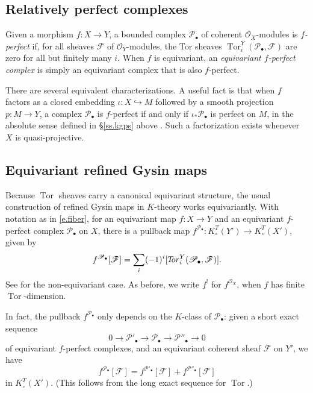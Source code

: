 \documentclass[11pt]{amsart}
\theoremstyle{definition}
\begin{document}
\subsection{Relatively perfect complexes}

Given a morphism $f\colon X \to Y$, a bounded complex ${\mathscr{P}}_\bullet$ of coherent ${\mathcal{O}}_X$-modules is \emph{$f$-perfect} if, for all sheaves ${\mathscr{F}}$ of ${\mathcal{O}}_Y$-modules, the Tor sheaves $\operatorname{Tor}^Y_i({\mathscr{P}}_\bullet,{\mathscr{F}})$ are zero for all but finitely many $i$.  When $f$ is equivariant, an \emph{equivariant $f$-perfect complex} is simply an equivariant complex that is also $f$-perfect.

There are several equivalent characterizations.  A useful fact is that when $f$ factors as a closed embedding $\iota\colon X \hookrightarrow M$ followed by a smooth projection $p\colon M \to Y$, a complex ${\mathscr{P}}_\bullet$ is $f$-perfect if and only if $\iota_*{\mathscr{P}}_\bullet$ is perfect on $M$, in the absolute sense defined in \S\ref{ss.kgps} above \cite[Exp.~III, 4.4]{sga6}.  Such a factorization exists whenever $X$ is quasi-projective.

\subsection{Equivariant refined Gysin maps}

Because $\operatorname{Tor}$ sheaves carry a canonical equivariant structure, the usual construction of refined Gysin maps in $K$-theory works equivariantly.  With notation as in \eqref{e.fiber}, for an equivariant map $f\colon X \to Y$ and an equivariant $f$-perfect complex ${\mathscr{P}}_\bullet$ on $X$, there is a pullback map $f^{{\mathscr{P}}_\bullet} \colon K_\circ^T(Y') \rightarrow K_\circ^T(X')$, given by
\begin{equation}\label{e.gysindef}
  f^{{\mathscr{P}}_\bullet}[{\mathscr{F}}] = \sum_i (-1)^i [{T\hspace{-.6ex}or}_i^Y({\mathscr{P}}_\bullet,{\mathscr{F}})].
\end{equation}
See \cite[\S2.2]{ks} for the non-equivariant case.  As before, we write $f^!$ for $f^{{\mathcal{O}}_X}$, when $f$ has finite $\operatorname{Tor}$-dimension.  

In fact, the pullback $f^{{\mathscr{P}}_\bullet}$ only depends on the $K$-class of ${\mathscr{P}}_\bullet$: given a short exact sequence
\[
  0 \to {\mathscr{P}}'_\bullet \to {\mathscr{P}}_\bullet \to {\mathscr{P}}''_\bullet \to 0
\]
of equivariant $f$-perfect complexes, and an equivariant coherent sheaf ${\mathscr{F}}$ on $Y'$, we have 
\[
  f^{{\mathscr{P}}_\bullet}[{\mathscr{F}}] = f^{{\mathscr{P}}'_\bullet}[{\mathscr{F}}] + f^{{\mathscr{P}}''_\bullet}[{\mathscr{F}}]
\]
in $K^T_\circ(X')$.  (This follows from the long exact sequence for $\operatorname{Tor}$.)
\end{document}
